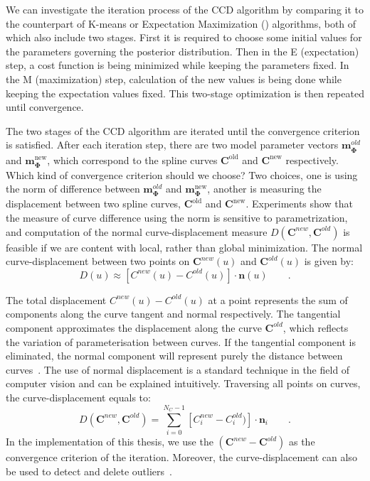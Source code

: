 We can investigate the iteration process of the CCD algorithm by
comparing it to the counterpart of K-means or
Expectation Maximization () algorithms, both of
which also include two stages. First it is required to choose some
initial values for the parameters governing the posterior
distribution. Then in the E (expectation) step, a cost function is
being minimized while keeping the parameters fixed. In the M (maximization)
step, calculation of the new values is being done while keeping the
expectation values fixed. This two-stage optimization is then repeated
until convergence. 


The two stages of the CCD algorithm are iterated until the convergence
criterion is satisfied. After each iteration step, there are two
model parameter vectors $\mathbf{m}_{\mathbf{\Phi}}^{old}$ and
$\mathbf{m}_{\mathbf{\Phi}}^{\mathrm{new}}$, which correspond to the
spline curves $\mathbf{C}^{\mathrm{old}}$ and
$\mathbf{C}^{\mathrm{new}}$ respectively. Which kind of convergence
criterion should we choose? Two choices, one is using the norm of
difference between $\mathbf{m}_{\mathbf{\Phi}}^{old}$ and
$\mathbf{m}_{\mathbf{\Phi}}^{\mathrm{new}}$, another is measuring
the displacement between two spline curves, $\mathbf{C}^{\mathrm{old}}$ and
$\mathbf{C}^{\mathrm{new}}$. Experiments show that the measure of
curve difference using the norm is sensitive to parametrization, and
computation of the normal curve-displacement measure $D(\mathbf{C}^{new},
\mathbf{C}^{old})$  is feasible if we are content with
local, rather than global minimization. The normal curve-displacement
between two points on $\mathbf{C}^{new}(u)$ and $\mathbf{C}^{old}(u)$ is given by:
\begin{equation}
  \label{eq:normald}
  D(u) \approx
  [C^{new}(u) - C^{old}(u)] \cdot \mathbf{n}(u)\qquad.
\end{equation}

The total displacement $C^{new}(u) - C^{old}(u)$
 at a point represents the sum of components along
the curve tangent and normal respectively. The tangential component
approximates the displacement along the curve
$\mathbf{C}^{old}$, which reflects the variation of parameterisation
between curves. If the tangential component is eliminated, the normal
component will represent purely the distance between curves~\cite{blake1998active}. The
use of normal displacement is a standard technique in the field of computer vision
and can be explained intuitively. 
Traversing all points on curves, the curve-displacement equals to:
\begin{equation}
  \label{eq:bigD}
  D(\mathbf{C}^{new}, \mathbf{C}^{old})  = \sum_{i=0}^{N_{C}-1} [C_{i}^{new} - C_{i}^{old})] \cdot \mathbf{n}_{i}\qquad.
\end{equation}
In the implementation of this thesis, we use the $(\mathbf{C}^{new} -
\mathbf{C}^{old})$ as the convergence criterion of the
iteration. Moreover, the curve-displacement can also be used to detect
and delete outliers~\cite{blake1998active}.

